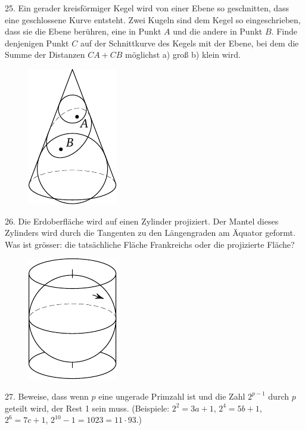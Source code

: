 \begin{problem}{25.}
	Ein gerader kreisförmiger Kegel wird von einer Ebene so geschnitten, dass eine geschlossene Kurve entsteht. Zwei Kugeln sind dem Kegel so eingeschrieben, dass sie die Ebene berühren, eine in Punkt $A$ und die andere in Punkt $B$. Finde denjenigen Punkt $C$ auf der Schnittkurve des Kegels mit der Ebene, bei dem die Summe der Distanzen $CA + CB$ möglichst a) groß b) klein wird. 
	\begin{figure}
		\includegraphics{taskbook-9}
	\end{figure} 
\end{problem}

\begin{problem}{26.}
	Die Erdoberfläche wird auf einen Zylinder projiziert. Der Mantel dieses Zylinders wird durch die Tangenten zu den Längengraden am Äquator geformt. Was ist grösser: die tatsächliche Fläche Frankreichs oder die projizierte Fläche?
	\begin{figure}
		\includegraphics{taskbook-10}
	\end{figure}
\end{problem}

\begin{problem}{27.}
	Beweise, dass wenn $p$ eine ungerade Primzahl ist und die Zahl $2^{p-1}$ durch $p$ geteilt wird, der Rest 1 sein muss. (Beispiele: $2^2 = 3a +1$, $2^4 = 5b+1$, $2^6 = 7c+1$, $2^{10} - 1 = 1023 = 11\cdot 93$.) 
\end{problem}

